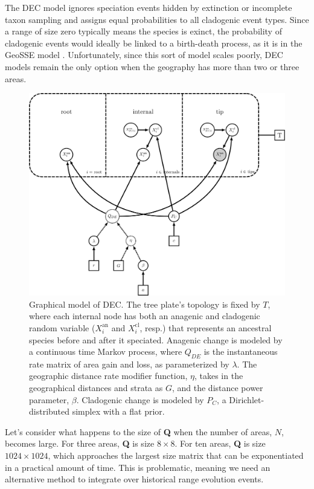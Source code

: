The DEC model ignores speciation events hidden by extinction or incomplete taxon sampling and assigns equal probabilities to all cladogenic event types.
Since a range of size zero typically means the species is exinct, the probability of cladogenic events would ideally be linked to a birth-death process, as it is in the GeoSSE model \citep{goldberg11}.
Unfortunately, since this sort of model scales poorly, DEC models remain the only option when the geography has more than two or three areas.


\begin{figure}[H]
\centering
\includegraphics[width=5in]{../RB_Biogeography_Tutorial/figures/bg_dec_dag}
\caption{Graphical model of DEC. The tree plate's topology is fixed by $T$, where each internal node has both an anagenic and cladogenic random variable ($X_i^{\text{an}}$ and $X_i^{\text{cl}}$, resp.) that represents an ancestral species before and after it speciated. Anagenic change is modeled by a continuous time Markov process, where $Q_{DE}$ is the instantaneous rate matrix of area gain and loss, as parameterized by $\lambda$. The geographic distance rate modifier function, $\eta$, takes in the geographical distances and strata as $G$, and the distance power parameter, $\beta$. Cladogenic change is modeled by $P_C$, a Dirichlet-distributed simplex with a flat prior.}
\end{figure}

Let's consider what happens to the size of \textbf{Q} when the number of areas, $N$, becomes large.
For three areas, \textbf{Q} is size $8 \times 8$.
For ten areas, \textbf{Q} is size $1024 \times 1024$, which approaches the largest size matrix that can be exponentiated in a practical amount of time.
This is problematic, meaning we need an alternative method to integrate over historical range evolution events.

